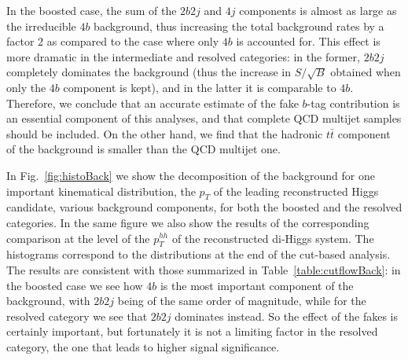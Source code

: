 In the boosted case, the sum of the $2b2j$ and $4j$ components is almost as large as the
irreducible $4b$ background, thus increasing the total background rates by a factor 2 as compared
to the case where only $4b$ is accounted for.
%
This effect is more dramatic in the intermediate and resolved categories: in the former,
$2b2j$ completely dominates the background (thus the increase in $S/\sqrt{B}$
obtained when only the $4b$ component is kept), and in the latter
it is comparable to $4b$.
%
Therefore, we conclude that an accurate estimate of the fake $b$-tag contribution is
an essential component of this analyses, and that complete QCD multijet samples
should be included.
%
On the other hand, we find that the hadronic $t\bar{t}$ component of the background
is smaller than the QCD multijet one.

In Fig.~\ref{fig:histoBack} we show the decomposition of the background for one important kinematical
distribution, the $p_T$ of the leading reconstructed Higgs candidate, various background
components, for both the boosted and the resolved categories.
%
In the same figure we also show the results of the corresponding comparison
at the level of the $p_T^{hh}$ of the
reconstructed di-Higgs system.
%
The histograms correspond to the distributions at the end of the cut-based
analysis.
%
The results are consistent with those summarized in
Table~\ref{table:cutflowBack}: in the boosted case we see how $4b$ is the most important
component of the background, with $2b2j$ being of the same order of magnitude, while
for the resolved category we see that $2b2j$ dominates instead.
%
So the effect of the fakes is certainly important, but fortunately it is not a limiting factor
in the resolved category, the one that leads to higher signal significance.

